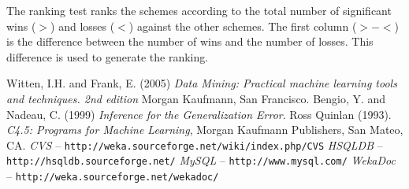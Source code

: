 \documentclass[a4paper]{article}
\begin{document}
The ranking test ranks the schemes according to the total number of significant wins ($>$) and losses ($<$) against the other schemes. The first column ($>-<$) is the difference between the number of wins and the number of losses. This difference is used to generate the ranking.

\begin{thebibliography}{999}
	 Witten, I.H. and Frank, E. (2005) \textit{Data Mining: Practical machine
learning tools and techniques. 2nd edition}  Morgan Kaufmann, San
Francisco.
	 Bengio, Y. and Nadeau, C. (1999) \textit{Inference for the Generalization Error}.
	 Ross Quinlan (1993). \textit{C4.5: Programs for Machine Learning}, Morgan Kaufmann Publishers, San Mateo, CA.
	 \textit{CVS} -- \texttt{http://weka.sourceforge.net/wiki/index.php/CVS}
	 \textit{HSQLDB} -- \texttt{http://hsqldb.sourceforge.net/}
	 \textit{MySQL} -- \texttt{http://www.mysql.com/}
	 \textit{WekaDoc} -- \texttt{http://weka.sourceforge.net/wekadoc/}
\end{thebibliography}
\end{document}
